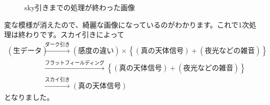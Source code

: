 \begin{figure}
{	\label{fig:skyed_figs_4}%
	}%
	\caption{sky引きまでの処理が終わった画像}
	\label{fig:skyed}
\end{figure}
変な模様が消えたので、綺麗な画像になっているのがわかります。これで1次処理は終わりです。スカイ引きによって
\begin{align*}
  (\text{生データ}) &\xrightarrow{\text{ダーク引き}} (感度の違い)\times\left\{ (真の天体信号) + (夜光などの雑音) \right\} \\
  &\xrightarrow{\text{フラットフィールディング}} \left\{ (真の天体信号) + (夜光などの雑音) \right\} \\
  &\xrightarrow{\text{スカイ引き}} (真の天体信号)
\end{align*}
となりました。

